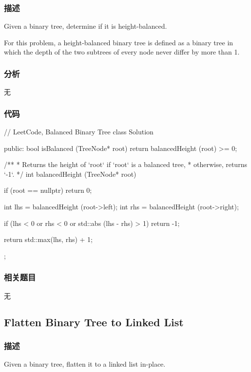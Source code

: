 \subsubsection{描述}
Given a binary tree, determine if it is height-balanced.

For this problem, a height-balanced binary tree is defined as a binary tree in which the depth of the two subtrees of every node never differ by more than 1.


\subsubsection{分析}
无


\subsubsection{代码}
\begin{Code}
// LeetCode, Balanced Binary Tree
class Solution {
public:
    bool isBalanced (TreeNode* root) {
        return balancedHeight (root) >= 0;
    }

    /**
     * Returns the height of `root` if `root` is a balanced tree,
     * otherwise, returns `-1`.
     */
    int balancedHeight (TreeNode* root) {
        if (root == nullptr)
            return 0;

        int lhs = balancedHeight (root->left);
        int rhs = balancedHeight (root->right);

        if (lhs < 0 or rhs < 0 or std::abs (lhs - rhs) > 1)
            return -1;

        return std::max(lhs, rhs) + 1;
    }
};
\end{Code}


\subsubsection{相关题目}
\begindot
\item 无
\myenddot


\subsection{Flatten Binary Tree to Linked List}
\label{sec:flatten-binary-tree-to-linked-list}


\subsubsection{描述}
Given a binary tree, flatten it to a linked list in-place.


